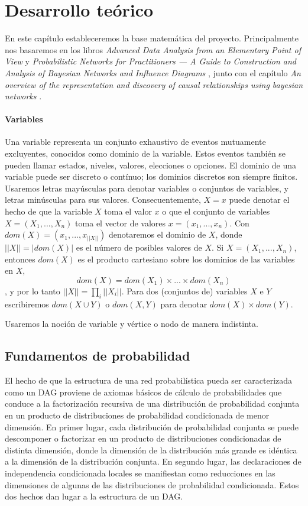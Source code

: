 \chapter{Desarrollo teórico}
En este capítulo estableceremos la base matemática del proyecto. Principalmente nos basaremos en 
los libros \textit{Advanced Data Analysis
from an Elementary Point of View} \cite{ada} y \textit{Probabilistic Networks for Practitioners — A
Guide to Construction and Analysis of Bayesian
Networks and Influence Diagrams} \cite{pgm}, junto con el capítulo \textit{An overview of the representation and 
discovery of causal relationships using bayesian networks} \cite{cooper}.

\subsubsection{Variables}
Una variable representa un conjunto exhaustivo de eventos mutuamente excluyentes, conocidos como dominio 
de la variable. Estos eventos también se pueden llamar estados, niveles, valores, elecciones o opciones. 
El dominio de una variable puede ser discreto o contínuo; los dominios discretos son siempre finitos. 
Usaremos letras mayúsculas para denotar variables o conjuntos de variables, y letras minúsculas para sus 
valores. Consecuentemente, $X = x$ puede denotar el hecho de que la variable $X$ toma el valor $x$ o que 
el conjunto de variables $X = (X_{1},...,X_{n})$ toma el vector de valores $x = (x_{1},...,x_{n})$. 
Con $dom(X)= (x_{1},...,x_{||X||})$ denotaremos el dominio de $X$, donde $||X|| = |dom(X)|$ es el número 
de posibles valores de $X$. Si $X = (X_{1},...,X_{n})$, entonces $dom(X)$ es el producto cartesiano sobre 
los dominios de las variables en $X$, $$dom(X)=dom(X_{1})\times ... \times dom(X_{n})$$, y por lo tanto 
$||X|| = \prod_i ||X_{i}||$. Para dos (conjuntos de) variables $X$ e $Y$ escribiremos $dom(X \cup Y)$ 
o $dom(X,Y)$ para denotar $dom(X) \times dom(Y)$.

Usaremos la noción de variable y vértice o nodo de manera indistinta.  

\section{Fundamentos de probabilidad} 
El hecho de que la estructura de una red probabilística pueda ser caracterizada como un DAG proviene de axiomas básicos 
de cálculo de probabilidades que conduce a la factorización recursiva de una distribución de probabilidad conjunta en 
un producto de distribuciones de probabilidad condicionada de menor dimensión. En primer lugar, cada distribución de 
probabilidad conjunta se puede descomponer o factorizar en un producto de distribuciones condicionadas de distinta 
dimensión, donde la dimensión de la distribución más grande es idéntica a la dimensión de la distribución conjunta. En 
segundo lugar, las declaraciones de independencia condicionada locales se manifiestan como reducciones en las dimensiones 
de algunas de las distribuciones de probabilidad condicionada. Estos dos hechos dan lugar a la estructura de un DAG.

